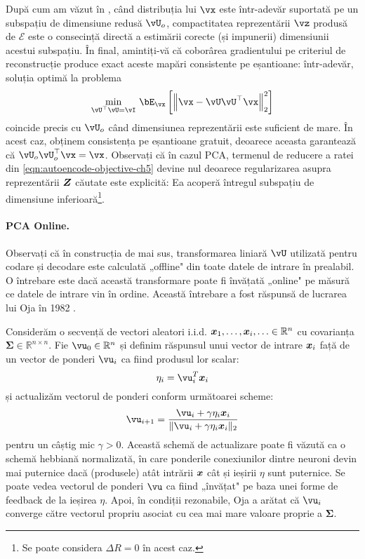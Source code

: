 \documentclass[../../book-main_ro.tex]{subfiles}
\begin{document}
După cum am văzut în , când distribuția lui $\vx$ este într-adevăr
suportată pe un subspațiu de dimensiune redusă $\vU_o$, compactitatea
reprezentării
$\vz$ produsă de $\mathcal{E}$ este o consecință directă a estimării corecte
(și impunerii) dimensiunii acestui subspațiu. În final,
amintiți-vă că coborârea gradientului pe criteriul de reconstrucție produce exact
aceste mapări consistente pe eșantioane: într-adevăr, soluția optimă
la problema
\begin{equation}\label{eq:pca-reconstruction-ch5}
  \min_{\vU^\top \vU = \vI}\, \bE_{\vx}\left[\norm*{\vx
  - \vU\vU^\top \vx}_2^2\right]
\end{equation}
coincide precis cu $\vU_o$ când dimensiunea reprezentării este
suficient de mare. În acest caz, obținem consistența pe eșantioane
gratuit, deoarece aceasta garantează că $\vU_o\vU_o^\top \vx = \vx$.
Observați că în cazul PCA, termenul de reducere a ratei din
\eqref{eqn:autoencode-objective-ch5} devine nul deoarece regularizarea
asupra reprezentării $\bm{Z}$ căutate este explicită: Ea acoperă întregul
subspațiu de dimensiune inferioară\footnote{Se poate considera $\Delta R = 0$ în acest caz.}.

\paragraph{PCA Online.} Observați că în construcția de mai sus, transformarea
liniară $\vU$
utilizată pentru codare și decodare este calculată „offline" din toate
datele de intrare în prealabil. O întrebare este dacă această transformare
poate fi învățată „online" pe măsură ce datele de intrare vin în ordine. Această
întrebare a fost răspunsă de lucrarea lui Oja în 1982 \cite{Oja1982SimplifiedNM}.
\begin{example} Considerăm o
  secvență de vectori aleatori i.i.d. $\bm{x}_1, \ldots, \bm{x}_i, \ldots \in
  \mathbb{R}^n$ cu covarianța $\boldsymbol{\Sigma} \in
  \mathbb{R}^{n\times n}$. Fie $\vu_0 \in \mathbb{R}^n$ și definim
  răspunsul unui vector de intrare $\bm{x}_i$ față de un vector de ponderi
  $\vu_i$ ca fiind produsul lor scalar:
  \begin{equation}
    \eta_i = \vu_i^T \x_i
  \end{equation}
  și actualizăm vectorul de ponderi conform următoarei scheme:
  \begin{equation}
    \vu_{i+1} = \frac{\vu_i + \gamma \eta_i \x_i}{\|\vu_i + \gamma
    \eta_i \x_i\|_2}
    \label{eqn:Hebbian}
  \end{equation}
  pentru un câștig mic $\gamma >0$. Această schemă de actualizare poate fi văzută
  ca o schemă hebbiană normalizată, în care ponderile conexiunilor
  dintre neuroni devin mai puternice dacă (produsele) atât intrării
  $\bm{x}$ cât și ieșirii $\eta$ sunt puternice. Se poate vedea vectorul de
  ponderi $\vu$ ca fiind „învățat" pe baza unei forme de feedback de la
  ieșirea $\eta$.
  Apoi, în condiții rezonabile, Oja \cite{Oja1982SimplifiedNM} a
  arătat că $\vu_i$ converge către vectorul propriu asociat cu
  cea mai mare valoare proprie a $\boldsymbol{\Sigma}$.
\end{example}
\end{document}
